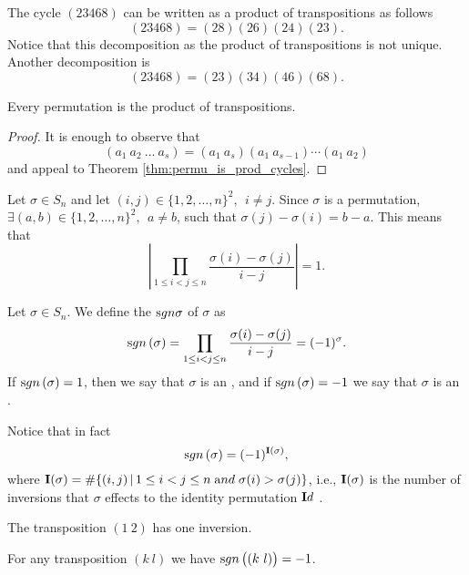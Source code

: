 \begin{exa}
The cycle $(23468)$ can be written as a product of transpositions
as follows
$$(23468) = (28)(26)(24)(23).$$ Notice that this decomposition as
the product of transpositions is not unique. Another decomposition
is $$(23468) = (23)(34)(46)(68).$$
\end{exa}
\begin{lemma}
Every permutation is the product of transpositions.
\label{lem:permu_is_prod_bicycles}\end{lemma}
\begin{proof}
It is enough to observe that
$$ (a_1\ a_2\ \ldots\ a_s) = (a_1\ a_s)(a_1\ a_{s - 1}) \cdots (a_1\ a_2)
$$and appeal to Theorem \ref{thm:permu_is_prod_cycles}.
\end{proof}
Let  $\sigma\in S_n$ and let $(i, j)\in \{1, 2, \ldots, n\}^2, \ \
i\neq j$. Since $\sigma$ is a permutation, $\exists (a, b)\in \{1,
2, \ldots, n\}^2, \ \  a\neq b$, such that $\sigma (j) - \sigma
(i) = b - a$. This means that $$ \left|\prod_{1\leq i<j\leq n}
\frac{\sigma(i)-\sigma(j)}{i-j}\right| = 1 . $$
\begin{df} Let  $\sigma\in S_n$. We define the  $\sgn\sigma$ of $\sigma$ as
$$\sgn{\sigma} = \prod_{1\leq i<j\leq n}
\frac{\sigma(i)-\sigma(j)}{i-j} = (-1)^{\sigma}.$$ If
$\sgn{\sigma} = 1$, then we say that $\sigma$ is an , and if $\sgn{\sigma} = -1$ we say that $\sigma$ is
an \negrito{odd permutation}.
\end{df}
\begin{rem}
Notice that in fact $$\sgn{\sigma} =(-1)^{{\textbf  I}(\sigma)},$$where
${\textbf  I}(\sigma)=\#\{(i,j)\,|\,1\leq i<j\leq n\;{\textrm  and
}\;\sigma(i)>\sigma(j)\}$, i.e., ${\textbf  I}(\sigma)$ is the number
of inversions that $\sigma$ effects to the identity permutation
${\mathbf Id\ }$.\end{rem}
\begin{exa}
The transposition $(1\ 2)$ has one inversion.
\end{exa}
\begin{lemma}
 For any transposition $(k\ l)$ we have $\sgn{(k\ l)} = -1$.
\end{lemma}
